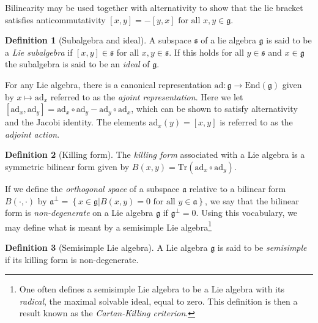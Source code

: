 \documentclass[twoside,utf8]{article}
\theoremstyle{plain}
\theoremstyle{definition}
\newtheorem{definition}{Definition}
\theoremstyle{remark}
\begin{document}
\noindent 
Bilinearity may be used together with alternativity to show that the lie bracket satisfies anticommutativity $[x,y]=-[y,x] \mbox{ for all } x,y \in \mathfrak{g}$.

\begin{definition}[Subalgebra and ideal]
A subspace $\mathfrak{s}$ of a lie algebra $\mathfrak{g}$ is said to be a \textit{Lie subalgebra} if $[x,y]\in \mathfrak{s}$ for all $x,y \in \mathfrak{s}$. If this holds for all $y \in \mathfrak{s}$ and $x\in \mathfrak{g}$ the subalgebra is said to be an \textit{ideal} of $\mathfrak{g}$.
\end{definition}

\noindent
For any Lie algebra, there is a canonical representation $\mbox{ad}: \mathfrak{g} \rightarrow \mbox{End}(\mathfrak{g})$ given by $x \mapsto \mbox{ad}_x$ referred to as the \textit{ajoint representation}. Here we let $[\mbox{ad}_x, \mbox{ad}_y ] = \mbox{ad}_x \circ \mbox{ad}_y - \mbox{ad}_y \circ \mbox{ad}_x$, which can be shown to satisfy alternativity and the Jacobi identity. The elements $\mbox{ad}_x(y)=[x,y]$ is referred to as the \textit{adjoint action}. 

\begin{definition}[Killing form]
The \textit{killing form} associated with a Lie algebra is a symmetric bilinear form given by $B(x,y)=\mbox{Tr}(\mbox{ad}_x \circ \mbox{ad}_y )$.
\end{definition}
\noindent
\noindent
If we define the \textit{orthogonal space} of a subspace $\mathfrak{a}$ relative to a bilinear form $B(\cdot,\cdot)$ by $\mathfrak{a}^\bot = \left\{ x \in \mathfrak{g} \big| B(x,y)=0 \mbox{ for all } y\in \mathfrak{a} \right\}$, we say that the bilinear form is \textit{non-degenerate} on a Lie algebra $\mathfrak{g}$ if $\mathfrak{g}^\bot=0$. Using this vocabulary, we may define what is meant by a semisimple Lie algebra\footnote{One often defines a semisimple Lie algebra to be a Lie algebra with its \textit{radical}, the maximal solvable ideal, equal to zero. This definition is then a result known as the \textit{Cartan-Killing criterion}.}

\begin{definition}[Semisimple Lie algebra]
A Lie algebra $\mathfrak{g}$ is said to be \textit{semisimple} if its killing form is non-degenerate.
\end{definition}
\end{document}
